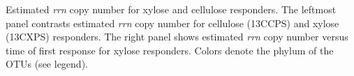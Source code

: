 Estimated \textit{rrn} copy number for xylose and cellulose responders. The
leftmost panel contrasts estimated \textit{rrn} copy number for cellulose
(13CCPS) and xylose (13CXPS) responders. The right panel shows estimated
\textit{rrn} copy number versus time of first response for xylose responders.
Colors denote the phylum of the OTUs (see legend).


